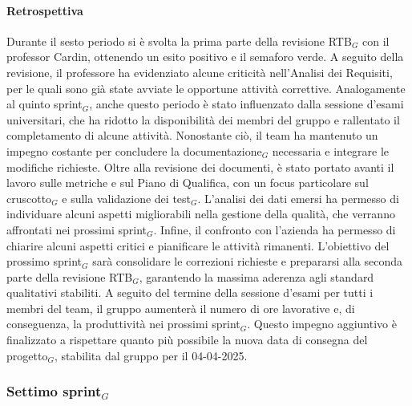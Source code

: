 \documentclass[10pt]{article}
\begin{document}
{{{{{{{    \paragraph{Retrospettiva}\mbox{}\vspace{0.4em}

    Durante il sesto periodo si è svolta la prima parte della revisione RTB$_G$ con il professor Cardin, ottenendo un esito positivo e il semaforo verde. A seguito della revisione, il professore ha evidenziato alcune criticità nell’Analisi dei Requisiti, per le quali sono già state avviate le opportune attività correttive.
    Analogamente al quinto sprint$_G$, anche questo periodo è stato influenzato dalla sessione d’esami universitari, che ha ridotto la disponibilità dei membri del gruppo e rallentato il completamento di alcune attività. Nonostante ciò, il team ha mantenuto un impegno costante per concludere la documentazione$_G$ necessaria e integrare le modifiche richieste.
    Oltre alla revisione dei documenti, è stato portato avanti il lavoro sulle metriche e sul Piano di Qualifica, con un focus particolare sul cruscotto$_G$ e sulla validazione dei test$_G$. L’analisi dei dati emersi ha permesso di individuare alcuni aspetti migliorabili nella gestione della qualità, che verranno affrontati nei prossimi sprint$_G$.
    Infine, il confronto con l’azienda ha permesso di chiarire alcuni aspetti critici e pianificare le attività rimanenti. L’obiettivo del prossimo sprint$_G$ sarà consolidare le correzioni richieste e prepararsi alla seconda parte della revisione RTB$_G$, garantendo la massima aderenza agli standard qualitativi stabiliti.
    A seguito del termine della sessione d'esami per tutti i membri del team, il gruppo aumenterà il numero di ore lavorative e, di conseguenza, la produttività nei prossimi sprint$_G$. Questo impegno aggiuntivo è finalizzato a rispettare quanto più possibile la nuova data di consegna del progetto$_G$, stabilita dal gruppo per il 04-04-2025.
    

    \newpage
    \subsubsection{Settimo sprint$_G$}
    \label{settimo-sprint$_G$}
        
}}}}}}}
\end{document}

